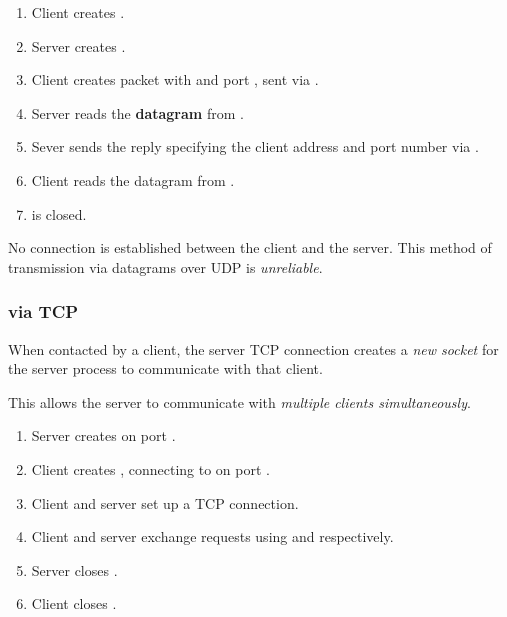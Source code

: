 \begin{enumerate}
    \item Client creates .
    \item Server creates .
    \item Client creates packet with  and port , sent via .
    \item Server reads the \textbf{datagram} from .
    \item Sever sends the reply specifying the client address and port number via .
    \item Client reads the datagram from .
    \item {} is closed.
\end{enumerate}

No connection is established between the client and the server.
This method of transmission via datagrams over UDP is \emph{unreliable}.

\subsubsection{via TCP}
When contacted by a client, the server TCP connection creates a \emph{new socket} for the
server process to communicate with that client.

This allows the server to communicate with \emph{multiple clients simultaneously}.

\begin{enumerate}
    \item Server creates  on port .
    \item Client creates , connecting to  on port .
    \item Client and server set up a TCP connection.
    \item Client and server exchange requests using  and 
    respectively.
    \item Server closes .
    \item Client closes .
\end{enumerate}